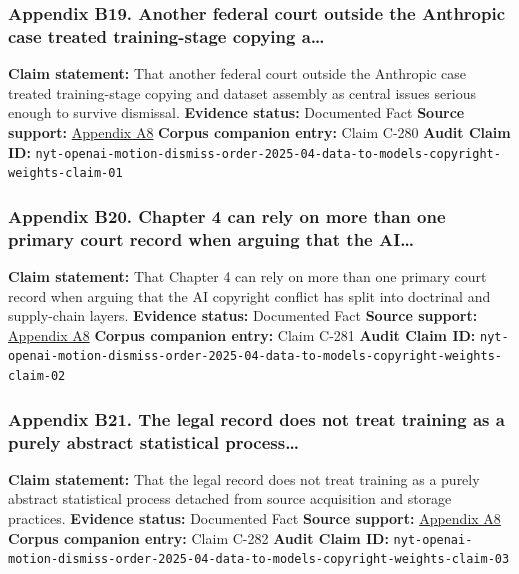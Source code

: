 \documentclass[
  american,
  11pt,
  letterpaper,
]{article}
\begin{document}
\subsubsection{Appendix B19. Another federal court outside the Anthropic
case treated training-stage copying
a\ldots{}}\label{ch-04-appendix-b19-another-federal-court-outside-the-anthropic-case-treated-training-stage-copying-a}

\textbf{Claim statement:} That another federal court outside the
Anthropic case treated training-stage copying and dataset assembly as
central issues serious enough to survive dismissal. \textbf{Evidence
status:} Documented Fact \textbf{Source support:}
\hyperref[ch-04-appendix-a8-the-new-york-times-company-v-microsoft-corporation-et-al-opinion-on-motions-to-dismiss]{Appendix
A8} \textbf{Corpus companion entry:} Claim C-280 \textbf{Audit Claim
ID:}
\texttt{nyt-openai-motion-dismiss-order-2025-04-data-to-models-copyright-weights-claim-01}

\subsubsection{Appendix B20. Chapter 4 can rely on more than one primary
court record when arguing that the
AI\ldots{}}\label{ch-04-appendix-b20-chapter-4-can-rely-on-more-than-one-primary-court-record-when-arguing-that-the-ai}

\textbf{Claim statement:} That Chapter 4 can rely on more than one
primary court record when arguing that the AI copyright conflict has
split into doctrinal and supply-chain layers. \textbf{Evidence status:}
Documented Fact \textbf{Source support:}
\hyperref[ch-04-appendix-a8-the-new-york-times-company-v-microsoft-corporation-et-al-opinion-on-motions-to-dismiss]{Appendix
A8} \textbf{Corpus companion entry:} Claim C-281 \textbf{Audit Claim
ID:}
\texttt{nyt-openai-motion-dismiss-order-2025-04-data-to-models-copyright-weights-claim-02}

\subsubsection{Appendix B21. The legal record does not treat training as
a purely abstract statistical
process\ldots{}}\label{ch-04-appendix-b21-the-legal-record-does-not-treat-training-as-a-purely-abstract-statistical-process}

\textbf{Claim statement:} That the legal record does not treat training
as a purely abstract statistical process detached from source
acquisition and storage practices. \textbf{Evidence status:} Documented
Fact \textbf{Source support:}
\hyperref[ch-04-appendix-a8-the-new-york-times-company-v-microsoft-corporation-et-al-opinion-on-motions-to-dismiss]{Appendix
A8} \textbf{Corpus companion entry:} Claim C-282 \textbf{Audit Claim
ID:}
\texttt{nyt-openai-motion-dismiss-order-2025-04-data-to-models-copyright-weights-claim-03}
\end{document}
